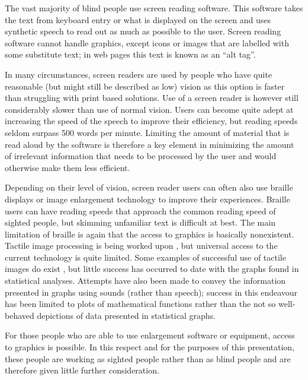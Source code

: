The vast majority of blind people use screen reading software. This software takes the text from keyboard entry or what is displayed on the screen and uses synthetic speech to read out as much as possible to the user. Screen reading software cannot handle graphics, except icons or images that are labelled with some substitute text; in web pages this text is known as an ``alt tag''.

In many circumstances, screen readers are used by people who have quite reasonable (but might still be described as low) vision as this option is faster than struggling with print based solutions. Use of a screen reader is however still considerably slower than use of normal vision. Users can become quite adept at increasing the speed of the speech to improve their efficiency, but reading speeds seldom surpass 500 words per minute. Limiting the amount of material that is read aloud by the software is therefore a key element in minimizing the amount of irrelevant information that needs to be processed by the user and would otherwise make them less efficient.

Depending on their level of vision, screen reader users can often also use braille displays or image enlargement technology to improve their experiences. Braille users can have reading speeds that approach the common reading speed of sighted people, but skimming unfamiliar text is difficult at best. The main limitation of braille is again that the access to graphics is basically nonexistent. Tactile image processing is being worked upon \citep{GardnerEtAl2004,WatanabeEtAl2012}, but universal access to the current technology is quite limited. Some examples of successful use of tactile images do exist \citep{Ebert2005},  but little success has occurred to date with the graphs found in statistical analyses.
Attempts have also been made to convey the information presented in graphs using sounds (rather than speech); success in this endeavour has been limited to plots of mathematical functions rather than the not so well-behaved depictions of data presented in statistical graphs.

For those people who are able to use enlargement software or equipment, access to graphics is possible. In this respect and for the purposes of this presentation, these people are working as sighted people rather than as blind people and are therefore given little further consideration.

